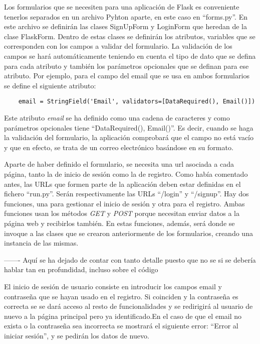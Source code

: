 Los formularios que se necesiten para una aplicación de Flask es conveniente tenerlos separados en un archivo Pyhton aparte, en este caso en ``forms.py''. En este archivo se definirán las clases SignUpForm y LoginForm que heredan de la clase FlaskForm. Dentro de estas clases se definirán los atributos, variables que se corresponden con los campos a validar del formulario. La validación de los campos se hará automáticamente teniendo en cuenta el tipo de dato que se defina para cada atributo y también los parámetros opcionales que se definan para ese atributo. Por ejemplo, para el campo del email que se usa en ambos formularios se define el siguiente atributo:

\begin{verbatim}
	email = StringField('Email', validators=[DataRequired(), Email()])
\end{verbatim}

Este atributo \textit{email} se ha definido como una cadena de caracteres y como parámetros opcionales tiene ``DataRequired(), Email()''. Es decir, cuando se haga la validación del formulario, la aplicación comprobará que el campo no está vacío y que en efecto, se trata de un correo electrónico basándose en su formato. 

Aparte de haber definido el formulario, se necesita una url asociada a cada página, tanto la de inicio de sesión como la de registro. Como había comentado antes, las URLs que formen parte de la aplicación deben estar definidas en el fichero ``run.py''. Serán respectivamente las URLs ``/login'' y ``/signup''. Hay dos funciones, una para gestionar el inicio de sesión y otra para el registro. Ambas funciones usan los métodos \textit{GET} y \textit{POST} porque necesitan enviar datos a la página web y recibirlos también. En estas funciones, además, será donde se invoque a las clases que se crearon anteriormente de los formularios, creando una instancia de las mismas.

------- Aquí se ha dejado de contar con tanto detalle puesto que no se si se debería hablar tan en profundidad, incluso sobre el código

El inicio de sesión de usuario consiste en introducir los campos email y contraseña que se hayan usado en el registro. Si coinciden y la contraseña es correcta se se dará acceso al resto de funcionalidades y se redirigirá al usuario de nuevo a la página principal pero ya identificado.En el caso de que el email no exista o la contraseña sea incorrecta se mostrará el siguiente error: ``Error al iniciar sesión'', y se pedirán los datos de nuevo.

